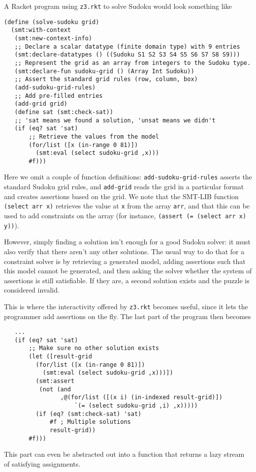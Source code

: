 A Racket program using \texttt{z3.rkt} to solve Sudoku would look something like

\begin{verbatim}
(define (solve-sudoku grid)
  (smt:with-context
   (smt:new-context-info)
   ;; Declare a scalar datatype (finite domain type) with 9 entries
   (smt:declare-datatypes () ((Sudoku S1 S2 S3 S4 S5 S6 S7 S8 S9)))
   ;; Represent the grid as an array from integers to the Sudoku type.
   (smt:declare-fun sudoku-grid () (Array Int Sudoku))
   ;; Assert the standard grid rules (row, column, box)
   (add-sudoku-grid-rules)
   ;; Add pre-filled entries
   (add-grid grid)
   (define sat (smt:check-sat))
   ;; 'sat means we found a solution, 'unsat means we didn't
   (if (eq? sat 'sat)
       ;; Retrieve the values from the model
       (for/list ([x (in-range 0 81)])
         (smt:eval (select sudoku-grid ,x)))
       #f)))
\end{verbatim}

Here we omit a couple of function definitions: \texttt{add-sudoku-grid-rules}
asserts the standard Sudoku grid rules, and \texttt{add-grid} reads the grid in
a particular format and creates assertions based on the grid. We note that the
SMT-LIB function \texttt{(select arr x)} retrieves the value at \texttt{x} from
the array \texttt{arr}, and that this can be used to add constraints on the
array (for instance, \texttt{(assert (= (select arr x) y))}).

However, simply finding a solution isn't enough for a good Sudoku solver: it
must also verify that there aren't any other solutions. The usual way to do that
for a constraint solver is by retrieving a generated model, adding assertions
such that this model cannot be generated, and then asking the solver whether the
system of assertions is still satisfiable. If they are, a second solution
exists and the puzzle is considered invalid.

This is where the interactivity offered by \texttt{z3.rkt} becomes useful, since
it lets the programmer add assertions on the fly. The last part of the program
then becomes

\begin{verbatim}
   ...
   (if (eq? sat 'sat)
       ;; Make sure no other solution exists
       (let ([result-grid
         (for/list ([x (in-range 0 81)])
           (smt:eval (select sudoku-grid ,x)))])
         (smt:assert
          (not (and
                ,@(for/list ([(x i) (in-indexed result-grid)])
                    `(= (select sudoku-grid ,i) ,x)))))
         (if (eq? (smt:check-sat) 'sat)
             #f ; Multiple solutions
             result-grid))
       #f)))
\end{verbatim}

This part can even be abstracted out into a function that returns a lazy
stream of satisfying assignments.
